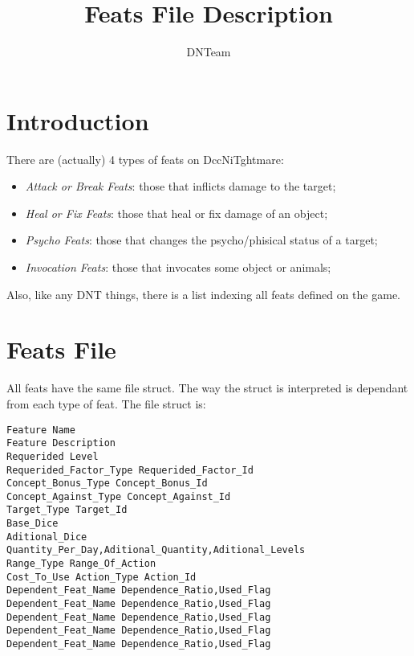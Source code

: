 \documentclass[letterpaper,12pt]{article}
\begin{document}
\title{Feats File Description}

\author{
DNTeam
}

\maketitle


\newpage

\tableofcontents

\newpage


\section{Introduction}

There are (actually) 4 types of feats on DccNiTghtmare:

\begin{itemize}
\item{{\it Attack or Break Feats}: those that inflicts damage to the target;}
\item{{\it Heal or Fix Feats}: those that heal or fix damage of an object;}
\item{{\it Psycho Feats}: those that changes the psycho/phisical status of a
target;} 
\item{{\it Invocation Feats}: those that invocates some object or animals;}
\end{itemize}

Also, like any DNT things, there is a list indexing all feats defined
on the game.

\section{Feats File}

All feats have the same file struct. The way the struct is interpreted is
dependant from each type of feat. The file struct is:

\begin{verbatim}
Feature Name
Feature Description
Requerided Level
Requerided_Factor_Type Requerided_Factor_Id
Concept_Bonus_Type Concept_Bonus_Id
Concept_Against_Type Concept_Against_Id
Target_Type Target_Id
Base_Dice
Aditional_Dice
Quantity_Per_Day,Aditional_Quantity,Aditional_Levels
Range_Type Range_Of_Action
Cost_To_Use Action_Type Action_Id
Dependent_Feat_Name Dependence_Ratio,Used_Flag
Dependent_Feat_Name Dependence_Ratio,Used_Flag
Dependent_Feat_Name Dependence_Ratio,Used_Flag
Dependent_Feat_Name Dependence_Ratio,Used_Flag
Dependent_Feat_Name Dependence_Ratio,Used_Flag
\end{verbatim}
\end{document}
